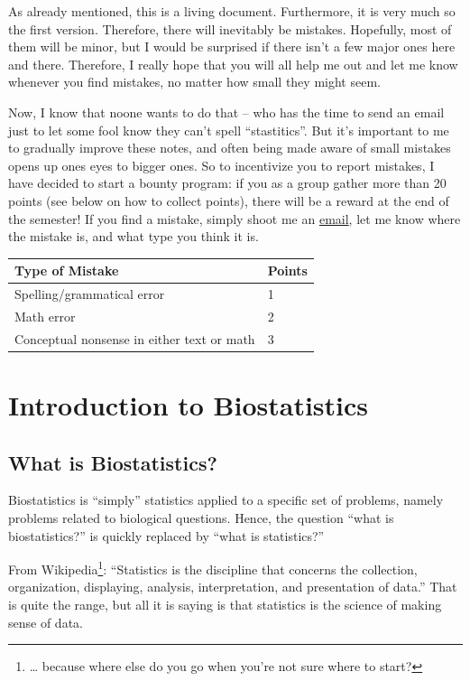 \documentclass[]{book}
\let\rmarkdownfootnote\footnote%
\def\footnote{\protect\rmarkdownfootnote}
\theoremstyle{definition}
\theoremstyle{definition}
\theoremstyle{definition}
\theoremstyle{remark}
\begin{document}
As already mentioned, this is a living document. Furthermore, it is very much so the first version. Therefore, there will inevitably be mistakes. Hopefully, most of them will be minor, but I would be surprised if there isn't a few major ones here and there. Therefore, I really hope that you will all help me out and let me know whenever you find mistakes, no matter how small they might seem.

Now, I know that noone wants to do that -- who has the time to send an email just to let some fool know they can't spell ``stastitics''. But it's important to me to gradually improve these notes, and often being made aware of small mistakes opens up ones eyes to bigger ones. So to incentivize you to report mistakes, I have decided to start a bounty program: if you as a group gather more than 20 points (see below on how to collect points), there will be a reward at the end of the semester! If you find a mistake, simply shoot me an \href{mailto:rtrane@wisc.edu}{email}, let me know where the mistake is, and what type you think it is.

\begin{longtable}[]{@{}ll@{}}
\toprule
Type of Mistake & Points\tabularnewline
\midrule
\endhead
Spelling/grammatical error & 1\tabularnewline
Math error & 2\tabularnewline
Conceptual nonsense in either text or math & 3\tabularnewline
\bottomrule
\end{longtable}

\hypertarget{intro}{%
\chapter{Introduction to Biostatistics}\label{intro}}

\hypertarget{what-is-biostatistics}{%
\section{What is Biostatistics?}\label{what-is-biostatistics}}

Biostatistics is ``simply'' statistics applied to a specific set of problems, namely problems related to biological questions. Hence, the question ``what is biostatistics?'' is quickly replaced by ``what is statistics?''

From Wikipedia\footnote{\ldots{} because where else do you go when you're not sure where to start?}: ``Statistics is the discipline that concerns the collection, organization, displaying, analysis, interpretation, and presentation of data.'' That is quite the range, but all it is saying is that statistics is the science of making sense of data.
\end{document}
